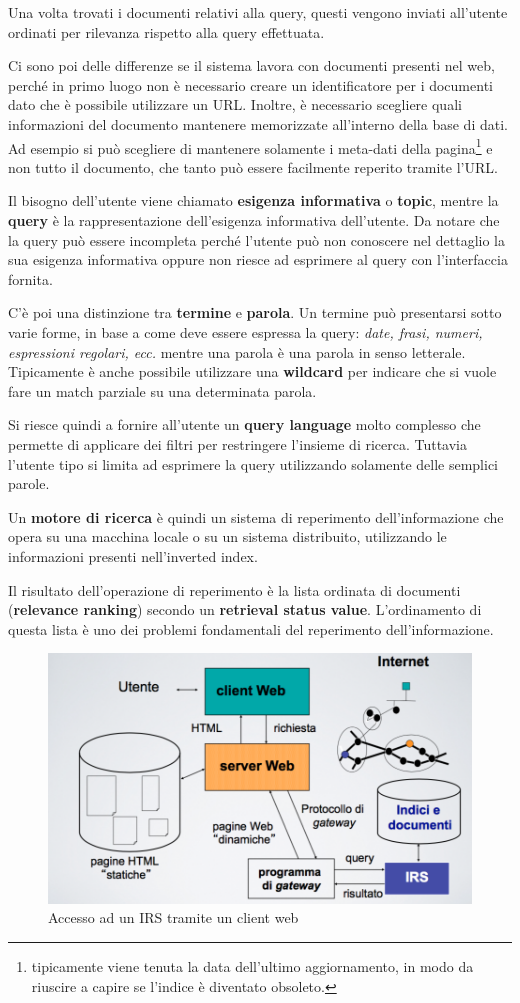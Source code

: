 Una volta trovati i documenti relativi alla query, questi vengono inviati all'utente ordinati per rilevanza rispetto alla query effettuata.

Ci sono poi delle differenze se il sistema lavora con documenti presenti nel web, perché in primo luogo non è necessario creare un identificatore per i documenti dato che è possibile utilizzare un URL.
Inoltre, è necessario scegliere quali informazioni del documento mantenere memorizzate all'interno della base di dati. Ad esempio si può scegliere di mantenere solamente i meta-dati della pagina\footnote{tipicamente viene tenuta la data dell'ultimo aggiornamento, in modo da riuscire a capire se l'indice è diventato obsoleto.} e non tutto il documento, che tanto può essere facilmente reperito tramite l'URL.

Il bisogno dell'utente viene chiamato \textbf{esigenza informativa} o \textbf{topic}, mentre la \textbf{query} è la rappresentazione dell'esigenza informativa dell'utente.
Da notare che la query può essere incompleta perché l'utente può non conoscere nel dettaglio la sua esigenza informativa oppure non riesce ad esprimere al query con l'interfaccia fornita.

C'è poi una distinzione tra \textbf{termine} e \textbf{parola}. Un termine può presentarsi sotto varie forme, in base a come deve essere espressa la query: \textit{date, frasi, numeri, espressioni regolari, ecc.} mentre una parola è una parola in senso letterale.
Tipicamente è anche possibile utilizzare una \textbf{wildcard} per indicare che si vuole fare un match parziale su una determinata parola.

Si riesce quindi a fornire all'utente un \textbf{query language} molto complesso che permette di applicare dei filtri per restringere l'insieme di ricerca. Tuttavia l'utente tipo si limita ad esprimere la query utilizzando solamente delle semplici parole.

Un \textbf{motore di ricerca} è quindi un sistema di reperimento dell'informazione che opera su una macchina locale o su un sistema distribuito, utilizzando le informazioni presenti nell'inverted index.

Il risultato dell'operazione di reperimento è la lista ordinata di documenti (\textbf{relevance ranking}) secondo un \textbf{retrieval status value}.
L'ordinamento di questa lista è uno dei problemi fondamentali del reperimento dell'informazione.

\begin{figure}[htbp]
	\centering
	\includegraphics[width=.6\textwidth]{images/l2-irsweb.png}
	\caption{Accesso ad un IRS tramite un client web}
\end{figure}

